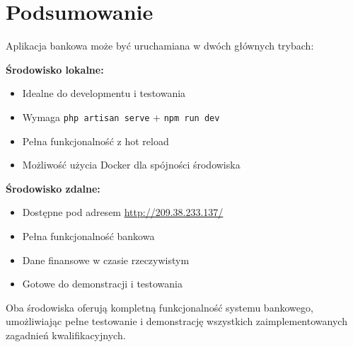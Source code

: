 \documentclass[12pt,a4paper]{article}
\begin{document}
    \section{Podsumowanie}

    Aplikacja bankowa może być uruchamiana w dwóch głównych trybach:

    \textbf{Środowisko lokalne:}
    \begin{itemize}
        \item Idealne do developmentu i testowania
        \item Wymaga \texttt{php artisan serve} + \texttt{npm run dev}
        \item Pełna funkcjonalność z hot reload
        \item Możliwość użycia Docker dla spójności środowiska
    \end{itemize}

    \textbf{Środowisko zdalne:}
    \begin{itemize}
        \item Dostępne pod adresem \url{http://209.38.233.137/}
        \item Pełna funkcjonalność bankowa
        \item Dane finansowe w czasie rzeczywistym
        \item Gotowe do demonstracji i testowania
    \end{itemize}

    Oba środowiska oferują kompletną funkcjonalność systemu bankowego, umożliwiając pełne testowanie i demonstrację wszystkich zaimplementowanych zagadnień kwalifikacyjnych.
\end{document}
